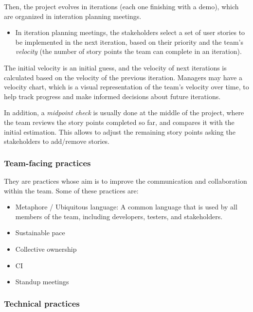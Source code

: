 \begin{itemize}
    Then, the project evolves in iterations (each one finishing with a demo), which are organized in interation planning meetings.
    \begin{itemize}
        \item In iteration planning meetings, the stakeholders select a set of user stories to be implemented in the next iteration, based on their priority and the team's \emph{velocity} (the number of story points the team can complete in an iteration).
    \end{itemize}

    The initial velocity is an initial guess, and the velocity of next iterations is calculated based on the velocity of the previous iteration. Managers may have a velocity chart, which is a visual representation of the team's velocity over time, to help track progress and make informed decisions about future iterations.

    In addition, a \emph{midpoint check} is usually done at the middle of the project, where the team reviews the story points completed so far, and compares it with the initial estimation. This allows to adjust the remaining story points asking the stakeholders to add/remove stories.
\end{itemize}

\subsubsection{Team-facing practices}

They are practices whose aim is to improve the communication and collaboration within the team. Some of these practices are:
\begin{itemize}
    \item Metaphore / Ubiquitous language: A common language that is used by all members of the team, including developers, testers, and stakeholders.
    \item Sustainable pace
    \item Collective ownership
    \item CI
    \item Standup meetings
\end{itemize}

\subsubsection{Technical practices}

